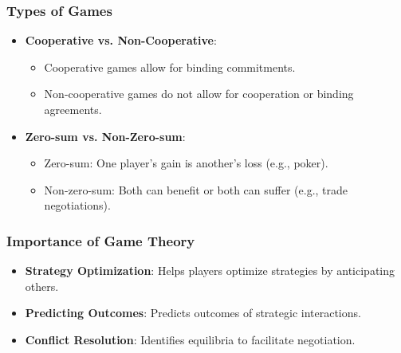 \documentclass[aspectratio=169]{beamer}
\begin{document}
\begin{frame}[fragile]
    \frametitle{Types of Games}
    \begin{itemize}
        \item \textbf{Cooperative vs. Non-Cooperative}: 
            \begin{itemize}
                \item Cooperative games allow for binding commitments.
                \item Non-cooperative games do not allow for cooperation or binding agreements.
            \end{itemize}
        \item \textbf{Zero-sum vs. Non-Zero-sum}:
            \begin{itemize}
                \item Zero-sum: One player's gain is another's loss (e.g., poker).
                \item Non-zero-sum: Both can benefit or both can suffer (e.g., trade negotiations).
            \end{itemize}
    \end{itemize}
\end{frame}

\begin{frame}[fragile]
    \frametitle{Importance of Game Theory}
    \begin{itemize}
        \item \textbf{Strategy Optimization}: Helps players optimize strategies by anticipating others.
        \item \textbf{Predicting Outcomes}: Predicts outcomes of strategic interactions.
        \item \textbf{Conflict Resolution}: Identifies equilibria to facilitate negotiation.
    \end{itemize}
\end{frame}
\end{document}

